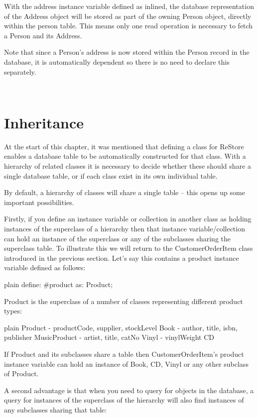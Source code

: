 \documentclass[10pt,twoside,english]{_support/latex/sbabook/sbabook}
\begin{document}
With the address instance variable defined as inlined, the database representation of the Address object will be stored as part of the owning Person object, directly within the person table. This means only one read operation is necessary to fetch a Person and its Address. 

Note that since a Person’s address is now stored within the Person record in the database, it is automatically dependent so there is no need to declare this separately.

 
\section{Inheritance }
At the start of this chapter, it was mentioned that defining a class for ReStore enables a database table to be automatically constructed for that class. With a hierarchy of related classes it is necessary to decide whether these should share a single database table, or if each class exist in its own individual table. 

By default, a hierarchy of classes will share a single table – this opens up some important possibilities. 

Firstly, if you define an instance variable or collection in another class as holding instances of the superclass of a hierarchy then that instance variable/collection can hold an instance of the superclass or any of the subclasses sharing the superclass table. To illustrate this we will return to the CustomerOrderItem class introduced in the previous section. Let’s say this contains a product instance variable defined as follows:

\begin{displaycode}{plain}
	define: #product as: Product;
\end{displaycode}

Product is the superclass of a number of classes representing different product types:

\begin{displaycode}{plain}
Product			- productCode, supplier, stockLevel
	Book			- author, title, isbn, publisher
	MusicProduct	- artist, title, catNo
		Vinyl		- vinylWeight
		CD
\end{displaycode}

If Product and its subclasses share a table then CustomerOrderItem’s product instance variable can hold an instance of Book, CD, Vinyl or any other subclass of Product.

A second advantage is that when you need to query for objects in the database, a query for instances of the superclass of the hierarchy will also find instances of any subclasses sharing that table: 
\end{document}
